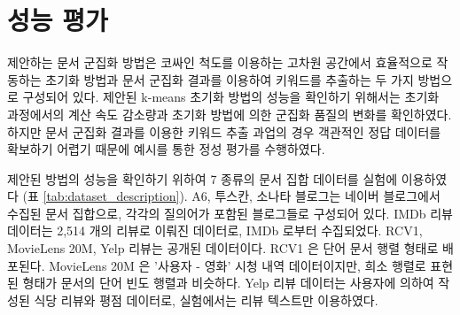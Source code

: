 \documentclass[oneside, ko,phd]{snuthesis_utf8_kor}
\begin{document}
\section{성능 평가}

제안하는 문서 군집화 방법은 코싸인 척도를 이용하는 고차원 공간에서 효율적으로 작동하는 초기화 방법과 문서 군집화 결과를 이용하여 키워드를 추출하는 두 가지 방법으로 구성되어 있다.
제안된 k-means 초기화 방법의 성능을 확인하기 위해서는 초기화 과정에서의 계산 속도 감소량과 초기화 방법에 의한 군집화 품질의 변화를 확인하였다.
하지만 문서 군집화 결과를 이용한 키워드 추출 과업의 경우 객관적인 정답 데이터를 확보하기 어렵기 때문에 예시를 통한 정성 평가를 수행하였다.

제안된 방법의 성능을 확인하기 위하여 7 종류의 문서 집합 데이터를 실험에 이용하였다 (표 \ref{tab:dataset_description}).
A6, 투스칸, 소나타 블로그는 네이버 블로그에서 수집된 문서 집합으로, 각각의 질의어가 포함된 블로그들로 구성되어 있다.
IMDb 리뷰 데이터는 2,514 개의 리뷰로 이뤄진 데이터로, IMDb 로부터 수집되었다.
RCV1, MovieLens 20M, Yelp 리뷰는 공개된 데이터이다.
RCV1 은 단어 문서 행렬 형태로 배포된다.
MovieLens 20M 은 '사용자 - 영화' 시청 내역 데이터이지만, 희소 행렬로 표현된 형태가 문서의 단어 빈도 행렬과 비슷하다.
Yelp 리뷰 데이터는 사용자에 의하여 작성된 식당 리뷰와 평점 데이터로, 실험에서는 리뷰 텍스트만 이용하였다.

\begin{table}[H]
\centering
\caption{실험에 이용한 7 종류의 데이터셋}
\label{tab:dataset_description}
\end{table}
\end{document}
